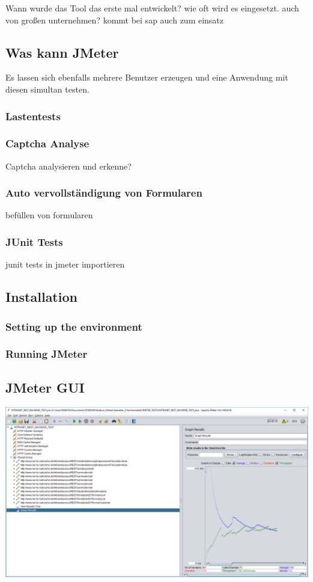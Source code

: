 \documentclass[a4paper,12pt]{article}
\begin{document}
Wann wurde das Tool das erste mal entwickelt? wie oft wird es eingesetzt. auch von großen unternehmen? kommt bei sap auch zum einsatz

\subsection{Was kann JMeter}
Es lassen sich ebenfalls mehrere Benutzer erzeugen und eine Anwendung mit diesen simultan testen.  
 
\subsubsection{Lastentests}

\subsubsection{Captcha Analyse}
Captcha analysieren und erkenne?

\subsubsection{Auto vervollständigung von Formularen}
befüllen von formularen

\subsubsection{JUnit Tests}
junit tests in jmeter importieren
\subsection{Installation}
\subsubsection{Setting up the environment}
\subsubsection{Running JMeter}

\subsection{JMeter GUI}
\includegraphics[width=1\textwidth]{bilder/jmeter_2.png}\par\vspace{1cm}
\end{document}
